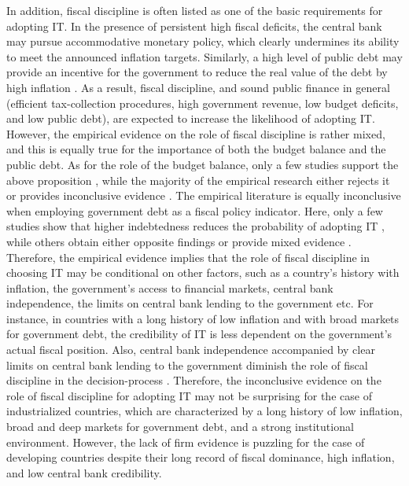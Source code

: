 \documentclass{article}
\begin{document}
In addition, fiscal discipline is often listed as one of the basic requirements for adopting IT. In the presence of persistent high fiscal deficits, the central bank may pursue accommodative monetary policy, which clearly undermines its ability to meet the announced inflation targets. Similarly, a high level of public debt may provide an incentive for the government to reduce the real value of the debt by high inflation \citep{Mishkin2000}. As a result, fiscal discipline, and sound public finance in general (efficient tax-collection procedures, high government revenue, low budget deficits, and low public debt), are expected to increase the likelihood of adopting IT. However, the empirical evidence on the role of fiscal discipline is rather mixed, and this is equally true for the importance of both the budget balance and the public debt. As for the role of the budget balance, only a few studies support the above proposition \citep{Hu2006, Lin2010}, while the majority of the empirical research either rejects it \citep{deMendonca2012, Pontines2013} or provides inconclusive evidence \citep{Carare2006, Leyva2008, Lin2007, Mishkin2002, Samarina2014, Vega2005}. The empirical literature is equally inconclusive when employing government debt as a fiscal policy indicator. Here, only a few studies show that higher indebtedness reduces the probability of adopting IT \citep{Goncalves2009, Minea2014, Thornton2017}, while others obtain either opposite findings \citep{Arsic2022} or provide mixed evidence \citep{Carare2006, Ismailov2016, Lin2009, Samarina2014, Samarina2014, Wang2016}. Therefore, the empirical evidence implies that the role of fiscal discipline in choosing IT may be conditional on other factors, such as a country’s history with inflation, the government’s access to financial markets, central bank independence, the limits on central bank lending to the government etc. For instance, in countries with a long history of low inflation and with broad markets for government debt, the credibility of IT is less dependent on the government’s actual fiscal position. Also, central bank independence accompanied by clear limits on central bank lending to the government diminish the role of fiscal discipline in the decision-process \citep{Carare2002}. Therefore, the inconclusive evidence on the role of fiscal discipline for adopting IT may not be surprising for the case of industrialized countries, which are characterized by a long history of low inflation, broad and deep markets for government debt, and a strong institutional environment. However, the lack of firm evidence is puzzling for the case of developing countries despite their long record of fiscal dominance, high inflation, and low central bank credibility.
\end{document}
